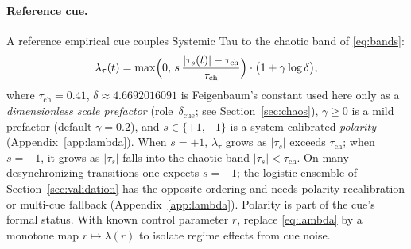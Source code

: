 \documentclass[11pt,a4paper]{article}
\begin{document}
\paragraph{Reference cue.}
A reference empirical cue couples Systemic Tau to the chaotic band of
\eqref{eq:bands}:
\begin{equation}
\label{eq:lambda}
\lambda_\tau(t)
=\max\Bigl(0,\,
s\,\frac{|\tau_s(t)|-\tau_{\mathrm{ch}}}{\tau_{\mathrm{ch}}}
\Bigr)
\cdot
\bigl(1+\gamma\log\delta\bigr),
\end{equation}
where $\tau_{\mathrm{ch}}=0.41$, $\delta\approx 4.6692016091$ is
Feigenbaum's constant used here only as a \emph{dimensionless scale
prefactor} (role~$\delta_{\mathrm{cue}}$; see Section~\ref{sec:chaos}),
$\gamma\geq 0$ is a mild prefactor (default $\gamma=0.2$), and
$s\in\{+1,-1\}$ is a system-calibrated \emph{polarity}
(Appendix~\ref{app:lambda}). When $s=+1$, $\lambda_\tau$ grows as
$|\tau_s|$ exceeds $\tau_{\mathrm{ch}}$; when $s=-1$, it grows as
$|\tau_s|$ falls into the chaotic band $|\tau_s|<\tau_{\mathrm{ch}}$.
On many desynchronizing transitions one expects $s=-1$; the logistic
ensemble of Section~\ref{sec:validation} has the opposite ordering and
needs polarity recalibration or multi-cue fallback
(Appendix~\ref{app:lambda}). Polarity is part of the cue's formal status.
With known control parameter $r$, replace \eqref{eq:lambda} by a monotone
map $r\mapsto\lambda(r)$ to isolate regime effects from cue noise.
\end{document}
